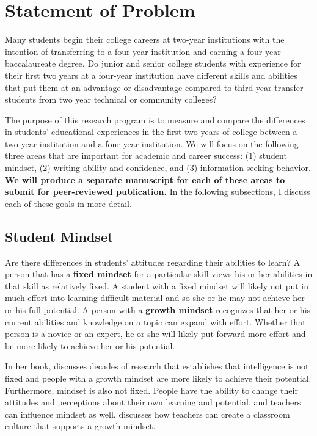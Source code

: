\documentclass[11pt]{article}
\newcommand{\citee}[1]{\citet*{#1}}
\begin{document}
\section{Statement of Problem}

Many students begin their college careers at two-year institutions with the intention of transferring to a four-year institution and earning a four-year baccalaureate degree.  Do junior and senior college students with experience for their first two years at a four-year institution have different skills and abilities that put them at an advantage or disadvantage compared to third-year transfer students from two year technical or community colleges?

The purpose of this research program is to measure and compare the differences in students' educational experiences in the first two years of college between a two-year institution and a four-year institution.  We will focus on the following three areas that are important for academic and career success: (1) student mindset, (2) writing ability and confidence, and (3) information-seeking behavior.  \textbf{We will produce a separate manuscript for each of these areas to submit for peer-reviewed publication.}  In the following subsections, I discuss each of these goals in more detail.

\subsection{Student Mindset}

Are there differences in students' attitudes regarding their abilities to learn?  A person that has a \textbf{fixed mindset} for a particular skill views his or her abilities in that skill as relatively fixed.  A student with a fixed mindset will likely not put in much effort into learning difficult material and so she or he may not achieve her or his full potential.  A person with a \textbf{growth mindset} recognizes that her or his current abilities and knowledge on a topic can expand with effort.  Whether that person is a novice or an expert, he or she will likely put forward more effort and be more likely to achieve her or his potential.

In her book, \citee{dweck2012} discusses decades of research that establishes that intelligence is not fixed and people with a growth mindset are more likely to achieve their potential.  Furthermore, mindset is also not fixed.  People have the ability to change their attitudes and perceptions about their own learning and potential, and teachers can influence mindset as well.  \citee{dweck2010} discusses how teachers can create a classroom culture that supports a growth mindset.
\end{document}
